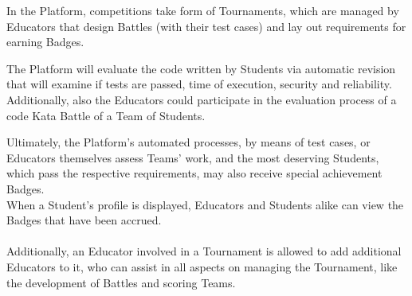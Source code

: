 In the Platform, competitions take form of Tournaments, which are managed by Educators that design Battles (with their test cases) and lay out requirements for earning Badges.

The Platform will evaluate the code written by Students via automatic revision that will examine if tests are passed, time of execution, security and reliability. Additionally, also the Educators could participate in the evaluation process of a code Kata Battle of a Team of Students.

Ultimately, the Platform's automated processes, by means of test cases, or Educators themselves assess Teams' work, and the most deserving Students, which pass the respective requirements, may also receive special achievement Badges.\\ When a Student's profile is displayed, Educators and Students alike can view the Badges that have been accrued.
\\ \\

Additionally, an Educator involved in a Tournament is allowed to add additional Educators to it, who can assist in all aspects on managing the Tournament, like the development of Battles and scoring Teams.

\newpage


